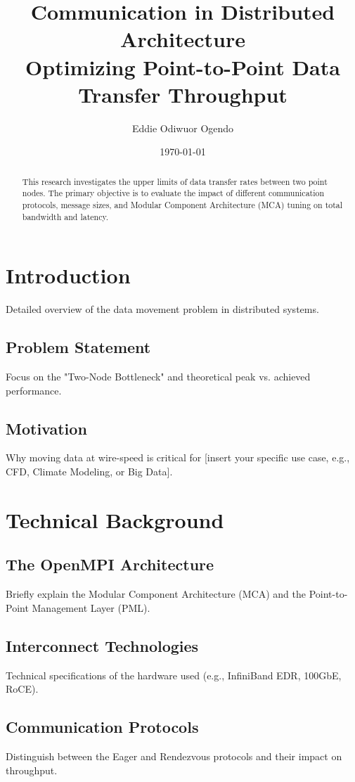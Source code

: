 \documentclass[11pt,a4paper]{article}
\title{Communication in Distributed Architecture \\ \large Optimizing Point-to-Point Data Transfer Throughput}
\author{Eddie Odiwuor Ogendo}
\date{\today}
\begin{document}
	
	\maketitle
	
	\begin{abstract}
		This research investigates the upper limits of data transfer rates between  two point nodes. The primary objective is to evaluate the impact of different communication protocols, message sizes, and Modular Component Architecture (MCA) tuning on total bandwidth and latency.
	\end{abstract}
	
	\tableofcontents
	
	\newpage
	
	\section{Introduction}
	\label{sec:intro}
	Detailed overview of the data movement problem in distributed systems.
	\subsection{Problem Statement}
	Focus on the "Two-Node Bottleneck" and theoretical peak vs. achieved performance.
	\subsection{Motivation}
	Why moving data at wire-speed is critical for [insert your specific use case, e.g., CFD, Climate Modeling, or Big Data].
	
	\section{Technical Background}
	\label{sec:background}
	\subsection{The OpenMPI Architecture}
	Briefly explain the Modular Component Architecture (MCA) and the Point-to-Point Management Layer (PML).
	\subsection{Interconnect Technologies}
	Technical specifications of the hardware used (e.g., InfiniBand EDR, 100GbE, RoCE).
	\subsection{Communication Protocols}
	Distinguish between the Eager and Rendezvous protocols and their impact on throughput.
	
\end{document}
